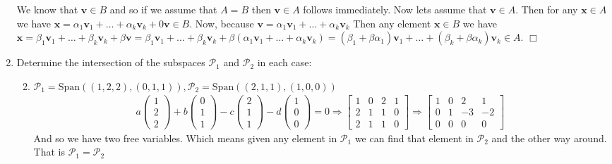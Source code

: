 \documentclass[letterpaper]{article}
\begin{document}
\begin{enumerate}
We know that $\mathbf{v}\in B$ and so if we assume that $A=B$ then $\mathbf{v}\in A$ follows immediately. Now lets assume that $\mathbf{v}\in A$. Then for any $\mathbf{x}\in A$ we have $\mathbf{x}=\alpha_1\mathbf{v}_1+\dots+\alpha_k\mathbf{v}_k+0\mathbf{v}\in B$.
Now, because $\mathbf{v}=\alpha_1\mathbf{v}_1+\dots+\alpha_k\mathbf{v}_k$ Then any element $\mathbf{x}\in B$ we have $\mathbf{x}=\beta_1\mathbf{v}_1+\dots+\beta_k\mathbf{v}_k+\beta\mathbf{v}=\beta_1\mathbf{v}_1+\dots+\beta_k\mathbf{v}_k+\beta(\alpha_1\mathbf{v}_1+\dots+\alpha_k\mathbf{v}_k)=(\beta_1+\beta\alpha_1)\mathbf{v}_1+\dots+(\beta_k+\beta\alpha_k)\mathbf{v}_k\in A$.
$\Box$
\item
Determine the intersection of the subspaces $\mathcal{P}_1$ and $\mathcal{P}_2$ in each case:
  \begin{enumerate}
  \setcounter{enumii}{1}
  \item
    $\mathcal{P}_1=\text{Span}\left((1,2,2),(0,1,1)\right),\mathcal{P}_2=\text{Span}\left((2,1,1),(1,0,0)\right)$
    \begin{align*}
      a\left(\begin{array}{r}1\\2\\2\end{array}\right)
      +b\left(\begin{array}{r}0\\1\\1\end{array}\right)
      -c\left(\begin{array}{r}2\\1\\1\end{array}\right)
      -d\left(\begin{array}{r}1\\0\\0\end{array}\right)
      =0\Rightarrow
      \left[\begin{array}{rrrr}
      1&0&2&1\\
      2&1&1&0\\
      2&1&1&0
      \end{array}\right]\Rightarrow
      \left[\begin{array}{rrrr}
      1&0&2&1\\
      0&1&-3&-2\\
      0&0&0&0
      \end{array}\right]
    \end{align*}
    And so we have two free variables. Which means given any element in $\mathcal{P}_1$ we can find that element in $\mathcal{P}_2$ and the other way around. That is $\mathcal{P}_1=\mathcal{P}_2$

\end{enumerate}
\end{enumerate}
\end{document}

